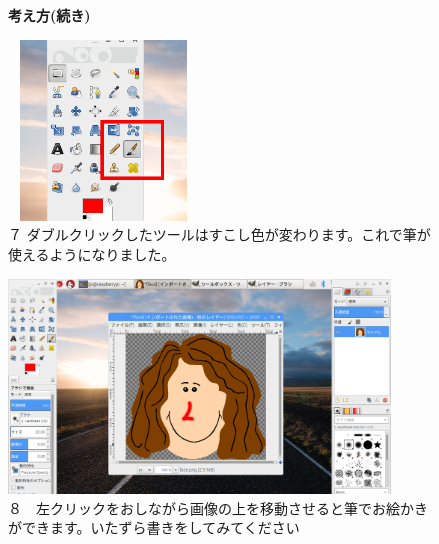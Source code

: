 \documentclass[a4paper,12pt]{jarticle}
\begin{document}
\begin{figure}[ht]
	\textbf{考え方(続き)}

	\begin{minipage}{\textwidth}
\centering
\begin{minipage}{5.76cm}
\includegraphics[width=5.05cm,height=4.796cm]{textbook-img130.png}\\
７
ダブルクリックしたツールはすこし色が変わります。これで筆が使えるようになりました。
\end{minipage}
\hfill
\begin{minipage}{10.2cm}
\includegraphics[width=10.134cm,height=5.697cm]{textbook-img131.png}\\
８　左クリックをおしながら画像の上を移動させると筆でお絵かきができます。いたずら書きをしてみてください
\end{minipage}
\end{minipage}


\bigskip


\end{figure}
\end{document}
